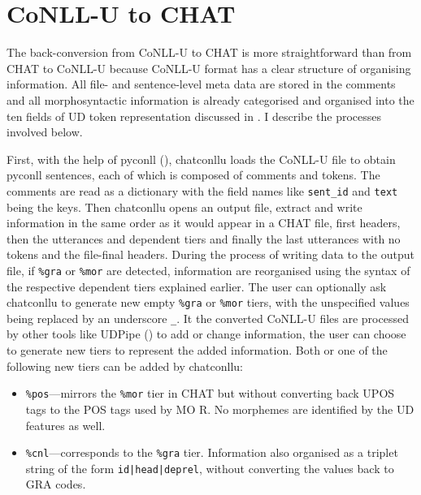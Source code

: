 \section{CoNLL-U to CHAT}

The back-conversion from CoNLL-U to CHAT is more straightforward than from CHAT to CoNLL-U because CoNLL-U format has a clear structure of organising information. All file- and sentence-level meta data are stored in the comments and all morphosyntactic information is already categorised and organised into the ten fields of UD token representation discussed in . I describe the processes involved below.

First, with the help of pyconll (\cite{pyconll}), chatconllu loads the CoNLL-U file to obtain pyconll sentences, each of which is composed of comments and tokens. The comments are read as a dictionary with the field names like \texttt{sent\_id} and \texttt{text} being the keys. Then chatconllu opens an output file, extract and write information in the same order as it would appear in a CHAT file, first headers, then the utterances and dependent tiers and finally the last utterances with no tokens and the file-final headers. During the process of writing data to the output file, if \texttt{\%gra} or \texttt{\%mor} are detected, information are reorganised using the syntax of the respective dependent tiers explained earlier. The user can optionally ask chatconllu to generate new empty \texttt{\%gra} or \texttt{\%mor} tiers, with the unspecified values being replaced by an underscore \texttt{\_}. It the converted CoNLL-U files are processed by other tools like UDPipe (\cite{straka-etal-2016-udpipe}) to add or change information, the user can choose to generate new tiers to represent the added information. Both or one of the following new tiers can be added by chatconllu:
\begin{itemize}
	\item \texttt{\%pos}---mirrors the \texttt{\%mor} tier in CHAT but without converting back UPOS tags to the POS tags used by MO
	R. No morphemes are identified by the UD features as well.
	\item \texttt{\%cnl}---corresponds to the \texttt{\%gra} tier. Information also organised as a triplet string of the form \texttt{id|head|deprel}, without converting the values back to GRA codes.
\end{itemize}


